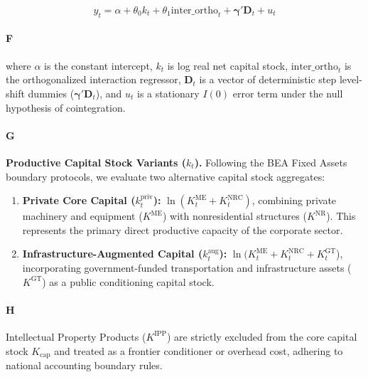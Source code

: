 \[y_t = \alpha + \theta_0 k_t + \theta_1 \text{inter\_ortho}_t + \boldsymbol{\gamma}' \mathbf{D}_t + u_t\]

\paragraph{F}
where $\alpha$ is the constant intercept, $k_t$ is log real net capital stock, $\text{inter\_ortho}_t$ is the orthogonalized interaction regressor, $\mathbf{D}_t$ is a vector of deterministic step level-shift dummies ($\boldsymbol{\gamma}' \mathbf{D}_t$), and $u_t$ is a stationary $I(0)$ error term under the null hypothesis of cointegration.

\paragraph{G}
\textbf{Productive Capital Stock Variants ($k_t$).} Following the BEA Fixed Assets boundary protocols, we evaluate two alternative capital stock aggregates:

\begin{enumerate}
	\item \textbf{Private Core Capital ($k_t^{\text{priv}}$):} $\ln(K_t^{\text{ME}} + K_t^{\text{NRC}})$, combining private machinery and equipment ($K^{\text{ME}}$) with nonresidential structures ($K^{\text{NR}}$). This represents the primary direct productive capacity of the corporate sector.
	\item \textbf{Infrastructure-Augmented Capital ($k_t^{\text{aug}}$):} $\ln(K_t^{\text{ME}} + K_t^{\text{NRC}} + K_t^{\text{GT}}$), incorporating government-funded transportation and infrastructure assets ($K^{\text{GT}}$) as a public conditioning capital stock.
\end{enumerate}

\paragraph{H}
Intellectual Property Products ($K^{\text{IPP}}$) are strictly excluded from the core capital stock $K_{\text{cap}}$ and treated as a frontier conditioner or overhead cost, adhering to national accounting boundary rules.

